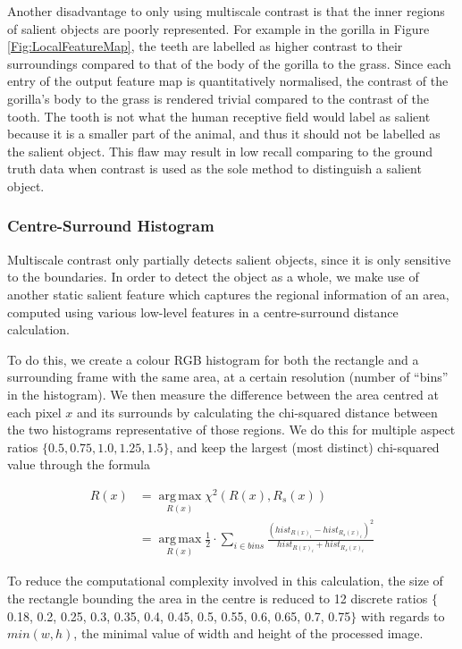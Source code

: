 \documentclass[10pt,twocolumn,letterpaper]{article}
\DeclareMathOperator*{\argmax}{arg\,max}
\newcommand{\SUM}{\sum\limits}
\begin{document}
Another disadvantage to only using multiscale contrast is that the inner regions of salient objects are poorly represented.  For example in the gorilla in Figure \ref{Fig:LocalFeatureMap}, the teeth are labelled as higher contrast to their surroundings compared to that of the body of the gorilla to the grass. Since each entry of the output feature map is quantitatively normalised, the contrast of the gorilla's body to the grass is rendered trivial compared to the contrast of the tooth. The tooth is not what the human receptive field would label as salient because it is a smaller part of the animal, and thus it should not be labelled as the salient object. This flaw may result in low recall comparing to the ground truth data when contrast is used as the sole method to distinguish a salient object.

\subsubsection{Centre-Surround Histogram}

Multiscale contrast only partially detects salient objects, since it is only sensitive to the boundaries. In order to detect the object as a whole, we make use of another static salient feature which captures the regional information of an area, computed using various low-level features in a centre-surround distance calculation. 

To do this, we create a colour RGB histogram for both the rectangle and a surrounding frame with the same area, at a certain resolution (number of ``bins'' in the histogram). We then measure the difference between the area centred at each pixel $x$ and its surrounds by calculating the chi-squared distance between the two histograms representative of those regions.  We do this for multiple aspect ratios $\{ 0.5, 0.75, 1.0, 1.25, 1.5\}$, and keep the largest (most distinct) chi-squared value through the formula


\begin{align*}
R(x) &= \argmax\limits_{R(x)}\chi^2(R(x), R_s(x)) \\ &=\argmax\limits_{R(x)}\frac{1}{2}\cdot\SUM_{i\in bins}\frac{(hist_{R(x)_i}-hist_{R_s(x)_i})^2}{hist_{R(x)_i}+hist_{R_s(x)_i}}
\end{align*}

To reduce the computational complexity involved in this calculation, the size of the rectangle bounding the area in the centre is reduced to 12 discrete ratios $\{$0.18, 0.2, 0.25, 0.3, 0.35, 0.4, 0.45, 0.5, 0.55, 0.6, 0.65, 0.7, 0.75$\}$ with regards to  $min(w,h)$, the minimal value of width and height of the processed image.
\end{document}

